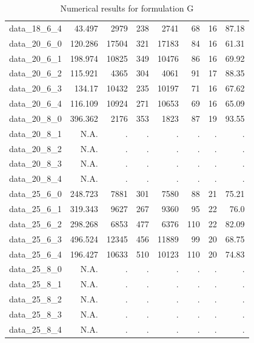 \documentclass[preprint,12pt,authoryear]{elsarticle}
\begin{document}
\begin{table}[h!]
{\begin{tabular}{rrrrrrrr}
  data\_18\_6\_4 & 43.497 & 2979 & 238 & 2741 & 68 & 16 & 87.18 \\
  data\_20\_6\_0 & 120.286 & 17504 & 321 & 17183 & 84 & 16 & 61.31 \\
  data\_20\_6\_1 & 198.974 & 10825 & 349 & 10476 & 86 & 16 & 69.92 \\
  data\_20\_6\_2 & 115.921 & 4365 & 304 & 4061 & 91 & 17 & 88.35 \\
  data\_20\_6\_3 & 134.17 & 10432 & 235 & 10197 & 71 & 16 & 67.62 \\
  data\_20\_6\_4 & 116.109 & 10924 & 271 & 10653 & 69 & 16 & 65.09 \\
  data\_20\_8\_0 & 396.362 & 2176 & 353 & 1823 & 87 & 19 & 93.55 \\
  data\_20\_8\_1 & N.A. & . & . & . & . & . & . \\
  data\_20\_8\_2 & N.A. & . & . & . & . & . & . \\
  data\_20\_8\_3 & N.A. & . & . & . & . & . & . \\
  data\_20\_8\_4 & N.A. & . & . & . & . & . & . \\
  data\_25\_6\_0 & 248.723 & 7881 & 301 & 7580 & 88 & 21 & 75.21 \\
  data\_25\_6\_1 & 319.343 & 9627 & 267 & 9360 & 95 & 22 & 76.0 \\
  data\_25\_6\_2 & 298.268 & 6853 & 477 & 6376 & 110 & 22 & 82.09 \\
  data\_25\_6\_3 & 496.524 & 12345 & 456 & 11889 & 99 & 20 & 68.75 \\
  data\_25\_6\_4 & 196.427 & 10633 & 510 & 10123 & 110 & 20 & 74.83 \\
  data\_25\_8\_0 & N.A. & . & . & . & . & . & . \\
  data\_25\_8\_1 & N.A. & . & . & . & . & . & . \\
  data\_25\_8\_2 & N.A. & . & . & . & . & . & . \\
  data\_25\_8\_3 & N.A. & . & . & . & . & . & . \\
  data\_25\_8\_4 & N.A. & . & . & . & . & . & . \\
  \hline
\end{tabular}
        }
        \caption{Numerical results for formulation G}
    \label{tab:G_results}
\end{table}
%
%



 



\end{document}
